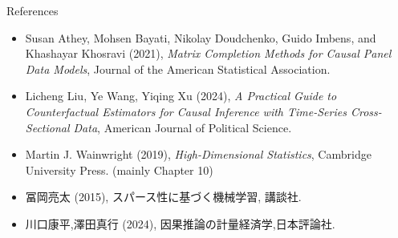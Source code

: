 \documentclass[xcolor=svgnames,aspectratio=169]{beamer}
\begin{document}
\begin{frame}{References}
    \begin{itemize}
        \item Susan Athey, Mohsen Bayati, Nikolay Doudchenko, Guido Imbens, and Khashayar Khosravi (2021), \textit{Matrix Completion Methods for Causal Panel Data Models}, Journal of the American Statistical Association.
        \item Licheng Liu, Ye Wang, Yiqing Xu (2024), \textit{A Practical Guide to Counterfactual Estimators for Causal Inference with Time-Series Cross-Sectional Data},  American Journal of Political Science.
        \item Martin J. Wainwright (2019), \textit{High-Dimensional Statistics}, Cambridge University Press. (mainly Chapter 10)
        \item 冨岡亮太 (2015), スパース性に基づく機械学習, 講談社.
        \item 川口康平,澤田真行 (2024), 因果推論の計量経済学,日本評論社.
    \end{itemize}
\end{frame}
\end{document}
